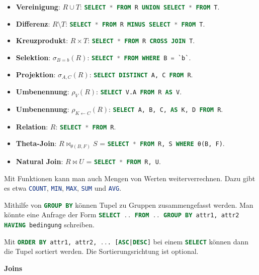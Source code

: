 \documentclass[a4paper,parskip=half*,DIV=15,fontsize=11pt]{scrartcl}
\newcommand{\sql}[1]{\lstinline[language=sql, mathescape=true]{#1}}
\begin{document}
\begin{itemize}
  \item \textbf{Vereinigung}: $R \cup T$: \sql{SELECT * FROM R UNION SELECT * FROM T}.
  \item \textbf{Differenz}: $R \setminus T$: \sql{SELECT * FROM R MINUS SELECT * FROM T}.
  \item \textbf{Kreuzprodukt}: $R \times T$: \sql{SELECT * FROM R CROSS JOIN T}.
  \item \textbf{Selektion}: $\sigma_{B=b}(R)$: \sql{SELECT * FROM WHERE B = `b`}.
  \item \textbf{Projektion}: $\sigma_{A,C}(R)$: \sql{SELECT DISTINCT A, C FROM R}.
  \item \textbf{Umbenennung}: $\rho_V(R)$: \sql{SELECT V.A FROM R AS V}.
  \item \textbf{Umbenennung}: $\rho_{K \leftarrow C}(R)$: \sql{SELECT A, B, C, AS K, D FROM R}.
  \item \textbf{Relation}: $R$: \sql{SELECT * FROM R}.
  \item \textbf{Theta-Join}: $R \bowtie_{\theta(B, F)} S$ = \sql{SELECT * FROM R, S WHERE θ(B, F)}.
  \item \textbf{Natural Join}: $R \bowtie U$ = \sql{SELECT * FROM R, U}.
\end{itemize}

Mit Funktionen kann man auch Mengen von Werten weiterverrechnen. Dazu gibt es etwa \sql{COUNT}, \sql{MIN}, \sql{MAX}, \sql{SUM} und \sql{AVG}.

Mithilfe von \sql{GROUP BY} können Tupel zu Gruppen zusammengefasst werden. Man könnte eine Anfrage der Form \sql{SELECT .. FROM .. GROUP BY attr1, attr2 HAVING bedingung} schreiben.

Mit \sql{ORDER BY attr1, attr2, ... [ASC|DESC]} bei einem \sql{SELECT} können dann die Tupel sortiert werden. Die Sortierungsrichtung ist optional.

\textbf{Joins}
\end{document}
